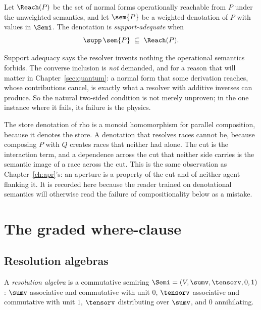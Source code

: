 \begin{definition}
\label{gw:def:support}
Let $\Reach(P)$ be the set of normal forms operationally reachable from $P$ under the
unweighted semantics, and let $\sem{P}$ be a weighted denotation of $P$ with values in
$\Semi$. The denotation is \emph{support-adequate} when
\[
  \supp\,\sem{P} \;\subseteq\; \Reach(P).
\]
\end{definition}

Support adequacy says the resolver invents nothing the operational semantics forbids.
The converse inclusion is \emph{not} demanded, and for a reason that will matter in
Chapter~\ref{sec:quantum}: a normal form that some derivation reaches, whose contributions
cancel, is exactly what a resolver with additive inverses can produce. So the natural
two-sided condition is not merely unproven; in the one instance where it fails, its
failure is the physics.

\begin{remark}
\label{gw:rmk:noncompositional}
The store denotation of rho is a monoid homomorphism for parallel composition, because it
denotes the store. A denotation that resolves races cannot be, because composing $P$ with
$Q$ creates races that neither had alone. The cut is the interaction term, and a
dependence across the cut that neither side carries is the semantic image of a race across
the cut. This is the same observation as Chapter~\ref{ch:apr}'s: an aperture is a
property of the cut and of neither agent flanking it. It is recorded here because the
reader trained on denotational semantics will otherwise read the failure of
compositionality below as a mistake.
\end{remark}

\section{The graded where-clause}
\label{gw:sec:clause}

\subsection{Resolution algebras}

\begin{definition}
\label{gw:def:algebra}
A \emph{resolution algebra} is a commutative semiring
$\Semi = (V, \sumv, \tensorv, 0, 1)$: $\sumv$ associative and commutative with unit $0$,
$\tensorv$ associative and commutative with unit $1$, $\tensorv$ distributing over
$\sumv$, and $0$ annihilating.
\end{definition}

